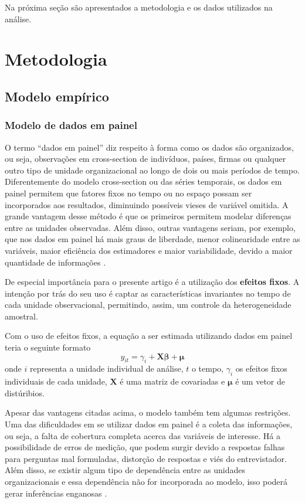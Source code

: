 Na próxima seção são apresentados a metodologia e os dados utilizados na análise.

\chapter{Metodologia}

\section{Modelo empírico}

\subsection{Modelo de dados em painel}

O termo “dados em painel” diz respeito à forma como os dados são organizados, ou seja, observações em cross-section de indivíduos, países, firmas ou qualquer outro tipo de unidade organizacional ao longo de dois ou mais períodos de tempo. Diferentemente do modelo cross-section ou das séries temporais, os dados em painel permitem que fatores fixos no tempo ou no espaço possam ser incorporados aos resultados, diminuindo possíveis vieses de variável omitida. A grande vantagem desse método é que os primeiros permitem modelar diferenças entre as unidades observadas. Além disso, outras vantagens seriam, por exemplo, que nos dados em painel há mais graus de liberdade, menor colinearidade entre as variáveis, maior eficiência dos estimadores e maior variabilidade, devido a maior quantidade de informações \cite{Baltagi2005}.

De especial importância para o presente artigo é a utilização dos \textbf{efeitos fixos}. A intenção por trás do seu uso é captar as características invariantes no tempo de cada unidade observacional, permitindo, assim, um controle da heterogeneidade amostral.

Com o uso de efeitos fixos, a equação a ser estimada utilizando dados em painel teria o seguinte formato 
\begin{equation} \label{eq:painel} \tag{3.1.1}
y_{it} = \gamma_i + \bm{X\beta} + \bm{\mu}
\end{equation}
onde $i$ representa a unidade individual de análise, $t$ o tempo, $\gamma_i$ os efeitos fixos individuais de cada unidade, $\bm{X}$ é uma matriz de covariadas e $\bm{\mu}$ é um vetor de distúribios.

Apesar das vantagens citadas acima, o modelo também tem algumas restrições. Uma das dificuldades em se utilizar dados em painel é a coleta das informações, ou seja, a falta de cobertura completa acerca das variáveis de interesse. Há a possibilidade de erros de medição, que podem surgir devido a respostas falhas para perguntas mal formuladas, distorção de respostas e viés do entrevistador. Além disso, se existir algum tipo de dependência entre as unidades organizacionais e essa dependência não for incorporada ao modelo, isso poderá gerar inferências enganosas \cite{Baltagi2005}.

